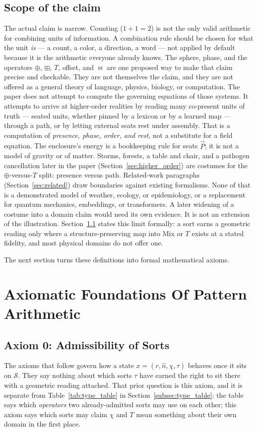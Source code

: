 \documentclass[12pt, a4paper]{article}
\begin{document}
\subsection{Scope of the claim}
\label{subsec:claim_scope}
The actual claim is narrow. Counting ($1+1=2$) is not the only valid
arithmetic for combining units of information. A combination rule
should be chosen for what the unit \emph{is} --- a count, a color, a
direction, a word --- not applied by default because it is the
arithmetic everyone already knows. The sphere, phase, and the
operators $\oplus$, $\boxplus$, $T$, offset, and $\bowtie$ are one
proposed way to make that claim precise and checkable. They are not
themselves the claim, and they are not offered as a general theory of
language, physics, biology, or computation.
The paper does not attempt to compute the governing equations of
those systems. It attempts to arrive at higher-order realities by
reading many co-present units of truth --- seated units, whether
pinned by a lexicon or by a learned map --- through a path, or by
letting external seats rest under assembly. That is a computation of
\emph{presence, phase, order, and rest}, not a substitute for a field
equation. The enclosure's energy is a bookkeeping rule for seats
$\vec P$; it is not a model of gravity or of matter.
Storms, forests, a table and chair, and a pathogen cancellation later in the paper
(Section~\ref{sec:higher_order}) are costumes for the
$\oplus$-versus-$T$ split: presence versus path. Related-work
paragraphs (Section~\ref{sec:related}) draw boundaries against
existing formalisms. None of that is a demonstrated model of weather,
ecology, or epidemiology, or a replacement for quantum mechanics,
embeddings, or transformers. A later widening of a costume into a
domain claim would need its own evidence. It is not an extension of
the illustration.
Section~\ref{subsec:axiom0_admissibility} states this limit formally:
a sort earns a geometric reading only where a structure-preserving
map into Mix or $T$ exists at a stated fidelity, and most physical
domains do not offer one.

The next section turns these definitions into formal mathematical axioms.


\section{Axiomatic Foundations Of Pattern Arithmetic}

\subsection{Axiom 0: Admissibility of Sorts}
\label{subsec:axiom0_admissibility}
The axioms that follow govern how a state $x=(r,\hat n,\chi,\tau)$
behaves once it sits on $\mathcal{S}$. They say nothing about which
sorts $\tau$ have earned the right to sit there with a geometric
reading attached. That prior question is this axiom, and it is
separate from Table~\ref{tab:type_table} in
Section~\ref{subsec:type_table}: the table says which
\emph{operators} two already-admitted sorts may use on each other;
this axiom says which sorts may claim $\chi$ and $T$ mean something
about their own domain in the first place.
\end{document}
